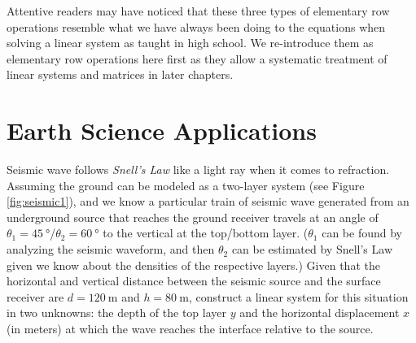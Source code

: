 Attentive readers may have noticed that these three types of elementary row operations resemble what we have always been doing to the equations when solving a linear system as taught in high school. We re-introduce them as elementary row operations here first as they allow a systematic treatment of linear systems and matrices in later chapters.

\section{Earth Science Applications}
\label{section:ch1earth}
\begin{exmp}
\label{exmp:seismic1}
Seismic wave follows \textit{Snell's Law} like a light ray when it comes to refraction. Assuming the ground can be modeled as a two-layer system (see Figure \ref{fig:seismic1}), and we know a particular train of seismic wave generated from an underground source that reaches the ground receiver travels at an angle of $\theta_1 = \SI{45}{\degree}$/$\theta_2 = \SI{60}{\degree}$ to the vertical at the top/bottom layer. ($\theta_1$ can be found by analyzing the seismic waveform, and then $\theta_2$ can be estimated by Snell's Law given we know about the densities of the respective layers.) Given that the horizontal and vertical distance between the seismic source and the surface receiver are $d = \SI{120}{\m}$ and $h = \SI{80}{\m}$, construct a linear system for this situation in two unknowns: the depth of the top layer $y$ and the horizontal displacement $x$ (in meters) at which the wave reaches the interface relative to the source.
\end{exmp}
